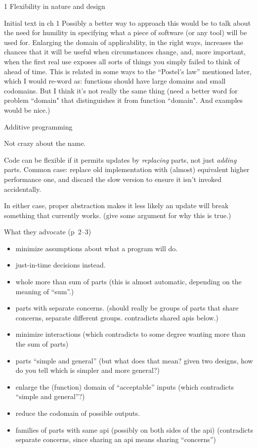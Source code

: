 \documentclass[12pt]{PalisadesLakesBook}
\begin{document}
\begin{plSection}{}
\begin{plSection}{1 Flexibility in nature and design}
\begin{plSection}{Initial text in ch 1}
Possibly a better way to approach this
would be to talk about the need for humility in specifying
what a piece of software (or any tool) will be used for.
Enlarging the domain of applicability, in the right ways,
increases the chances that it will be useful when circumstances 
change, and, more important, 
when the first real use exposes all sorts of things 
you simply failed to think of ahead of time.
This is related in some ways to the ``Postel's law''
mentioned later, which I would re-word as:
functions should have large domains and small codomains.
But I think it's not really the same thing
(\TODO need a better word for problem ``domain"
that distinguishes it from function ``domain".
And examples would be nice.)

\begin{plSection}{Additive programming}
\label{sec:AdditiveProgramming}

Not crazy about the name.

Code can be flexible if it permits updates by \emph{replacing}
parts, not just \emph{adding} parts.
Common case: 
replace old implementation with (almost) equivalent 
higher performance one, and discard the slow version to ensure
it isn't invoked accidentally. 

In either case, proper abstraction makes it less likely
an update will break something that currently works.
(\TODO give some argument for why this is true.)

What they advocate (p~2--3)
\begin{itemize}
  \item minimize assumptions about what a program will do.
  \item just-in-time decisions instead.
  \item whole more than sum of parts (this is almost automatic,
  depending on the meaning of ``sum''.)
  \item parts with separate concerns. (should really be groups of
  parts that share concerns, separate different groups.
  contradicts shared apis below.)
  \item minimize interactions (which contradicts to some degree
  wanting more than the sum of parts)
  \item parts ``simple and general'' 
  (but what does that mean? given two designs, how do you
  tell which is simpler and more general?)
  \item enlarge the (function) domain of ``acceptable'' inputs
  (which contradicts ``simple and general''?)
  \item reduce the codomain of possible outputs. 
  \item families of parts with same api (possibly on both sides
  of the api) (contradicts separate concerns, since sharing
  an api means sharing ``concerns'')
\end{itemize}


\end{plSection}
\end{plSection}
\end{plSection}
\end{plSection}
\end{document}
